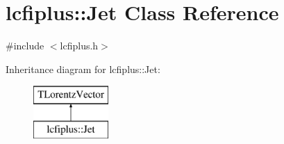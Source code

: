 \section{lcfiplus\+:\+:Jet Class Reference}
\label{classlcfiplus_1_1Jet}


{\ttfamily \#include $<$lcfiplus.\+h$>$}

Inheritance diagram for lcfiplus\+:\+:Jet\+:\begin{figure}[H]
\begin{center}
\leavevmode
\includegraphics[height=2.000000cm]{classlcfiplus_1_1Jet}
\end{center}
\end{figure}
